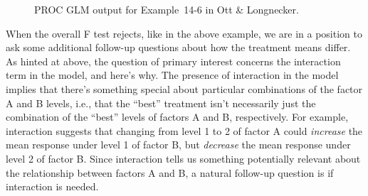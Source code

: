 \documentclass[a4paper, 12pt]{article}
\theoremstyle{plain}
\theoremstyle{definition}
\theoremstyle{remark}
\begin{document}
\begin{figure}[t]
\begin{center}
\end{center}
\caption{PROC GLM output for Example~14-6 in Ott \& Longnecker.}
\label{fig:factorial.anova}
\end{figure}

When the overall F test rejects, like in the above example, we are in a position to ask some additional follow-up questions about how the treatment means differ.  As hinted at above, the question of primary interest concerns the interaction term in the model, and here's why.  The presence of interaction in the model implies that there's something special about particular combinations of the factor A and B levels, i.e., that the ``best'' treatment isn't necessarily just the combination of the ``best'' levels of factors A and B, respectively.  For example, interaction suggests that changing from level 1 to 2 of factor A could {\em increase} the mean response under level 1 of factor B, but {\em decrease} the mean response under level 2 of factor B.  Since interaction tells us something potentially relevant about the relationship between factors A and B, a natural follow-up question is if interaction is needed.  
\end{document}

